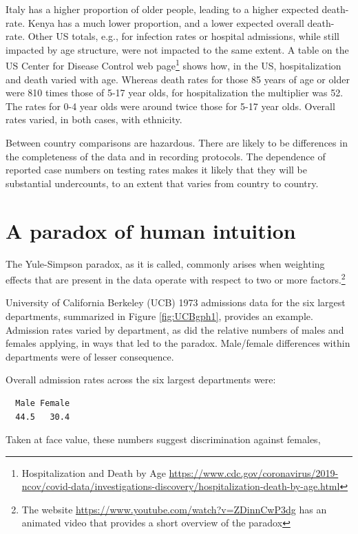 \documentclass[
  10pt,
  b5paper]{book}
\begin{document}
Italy has a higher proportion of older people, leading to a higher
expected death-rate. Kenya has a much lower proportion, and a lower
expected overall death-rate. Other US totals, e.g., for infection rates
or hospital admissions, while still impacted by age structure, were not
impacted to the same extent. A table on the US Center for Disease
Control web page\footnote{Hospitalization and Death by Age \url{https://www.cdc.gov/coronavirus/2019-ncov/covid-data/investigations-discovery/hospitalization-death-by-age.html}}
shows how, in the US, hospitalization and death varied with
age. Whereas death rates for those 85 years of age or older were
810 times those of 5-17 year olds, for hospitalization the multiplier
was 52. The rates for 0-4 year olds were around twice those for
5-17 year olds. Overall rates varied, in both cases, with ethnicity.

Between country comparisons are hazardous. There are likely to be
differences in the completeness of the data and in recording protocols.
The dependence of reported case numbers on testing rates makes it
likely that they will be substantial undercounts, to an extent that
varies from country to country.

\hypertarget{a-paradox-of-human-intuition}{%
\section{A paradox of human intuition}\label{a-paradox-of-human-intuition}}

The Yule-Simpson paradox, as it is called, commonly
arises when weighting effects that are present in the
data operate with respect to two or more
factors.\footnote{The website \url{https://www.youtube.com/watch?v=ZDinnCwP3dg}
  has an animated video that provides a short overview of the paradox}

University of California Berkeley (UCB)
1973 admissions data for the six largest departments,
summarized in Figure \ref{fig:UCBgph1}, provides an example.
Admission rates varied by department, as did the relative
numbers of males and females applying, in ways that led to the
paradox. Male/female differences within departments were of
lesser consequence.

Overall admission rates across the six largest departments were:

\begin{verbatim}
  Male Female 
  44.5   30.4 
\end{verbatim}

Taken at face value, these numbers suggest discrimination
against females,
\end{document}
